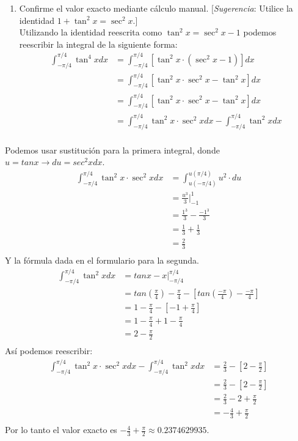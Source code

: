 \documentclass[12pt]{article}
\begin{document}
\begin{enumerate}[label=(\alph*)]
\item Confirme el valor exacto mediante cálculo manual. [\textit{Sugerencia}: Utilice la identidad $1 + \tan^2{x}=\sec^2{x}$.]\\
  Utilizando la identidad reescrita como $\tan^2{x}=\sec^2{x}-1$  podemos reescribir la integral de la siguiente forma:
  \begin{align*}
    \int_{-\pi/4}^{\pi/4} \tan^4{x} dx
    & = \int_{-\pi/4}^{\pi/4} \left[ \tan^2{x} \cdot (\sec^2{x}-1) \right]dx \\
    & = \int_{-\pi/4}^{\pi/4} [\tan^2{x} \cdot \sec^2{x} -  \tan^2{x} ] dx \\
    & = \int_{-\pi/4}^{\pi/4} [\tan^2{x} \cdot \sec^2{x} -  \tan^2{x} ] dx \\
    & = \int_{-\pi/4}^{\pi/4} \tan^2{x} \cdot \sec^2{x} dx - \int_{-\pi/4}^{\pi/4}   \tan^2{x}  dx \\
  \end{align*}
\end{enumerate}
Podemos usar sustitución para la primera integral, donde $u= tanx \rightarrow du=sec^{2}x dx$.\\
  \begin{align*}
    \int_{-\pi/4}^{\pi/4} \tan^2{x} \cdot \sec^2{x} dx
    & = \int_{u(-\pi/4)}^{u(\pi/4)} u^2 \cdot du \\
    & = \frac{u^{3}}{3} \Bigg|_{-1}^{1} \\
    & = \frac{1^{3}}{3} - \frac{-1^{3}}{3}  \\
    & = \frac{1}{3} + \frac{1}{3}  \\
    & = \frac{2}{3}   \\
  \end{align*}
  Y la fórmula dada en el formulario para la segunda.
    \begin{align*}
      \int_{-\pi/4}^{\pi/4}   \tan^2{x}  dx
      & = tanx - x  \Bigg|_{-\pi/4}^{\pi/4}\\
      & = tan\left(\frac{\pi}{4}\right) - \frac{\pi}{4} - \left[ tan\left(\frac{-\pi}{4}\right) - \frac{-\pi}{4} \right] \\
      & = 1 - \frac{\pi}{4} - \left[ -1 + \frac{\pi}{4} \right] \\
      & = 1 - \frac{\pi}{4} + 1 - \frac{\pi}{4} \\
      & = 2 - \frac{\pi}{2}  \\
    \end{align*}
    Así podemos reescribir:
      \begin{align*}
        \int_{-\pi/4}^{\pi/4} \tan^2{x} \cdot \sec^2{x} dx - \int_{-\pi/4}^{\pi/4}   \tan^2{x}  dx 
       & = \frac{2}{3} - \left[ 2 - \frac{\pi}{2} \right]\\
       & = \frac{2}{3} - \left[ 2 - \frac{\pi}{2} \right]\\
       & = \frac{2}{3} - 2 + \frac{\pi}{2} \\
       & = -\frac{4}{3}  + \frac{\pi}{2} \\
      \end{align*}
Por lo tanto el valor exacto es $-\frac{4}{3} + \frac{\pi}{2} \approx 0.2374629935 $.
\end{document}
